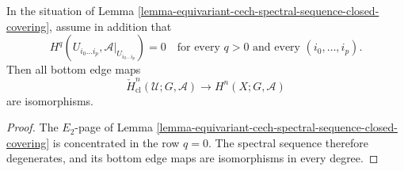 \begin{lemma}
\label{lemma-equivariant-cech-spectral-sequence-closed-acyclic-cover}
\begin{reference}
\cite[Chapter V, \S 5.5, Corollaries 1 and 2 to Theorem 5.5.3,
pp. 208--209]{Tohoku}
\end{reference}
In the situation of Lemma
\ref{lemma-equivariant-cech-spectral-sequence-closed-covering}, assume in
addition that
$$
H^q(U_{i_0\ldots i_p},\mathcal A|_{U_{i_0\ldots i_p}})=0
\quad\text{for every }q>0\text{ and every }(i_0,\ldots,i_p).
$$
Then all bottom edge maps
$$
\check H^n_{\mathrm{cl}}(\mathcal U;G,\mathcal A)
\longrightarrow H^n(X;G,\mathcal A)
$$
are isomorphisms.
\end{lemma}

\begin{proof}
The $E_2$-page of Lemma
\ref{lemma-equivariant-cech-spectral-sequence-closed-covering} is
concentrated in the row $q=0$.  The spectral sequence therefore degenerates,
and its bottom edge maps are isomorphisms in every degree.
\end{proof}
